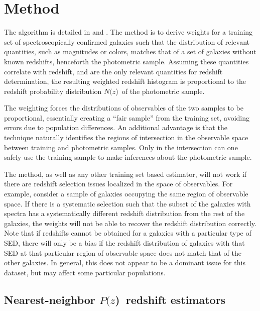 \documentclass[12pt,preprint]{aastex}
\newcommand{\pofz}{$P(z$)}
\newcommand{\nofz}{$N(z$)}
\begin{document}
\section{Method} \label{sec:method}

The algorithm is detailed in \citet{LimaPhotoz08} and \citet{CunhaPhotoz09}.
The method is to derive weights for a training set of spectroscopically
confirmed galaxies such that the distribution of relevant quantities, such as
magnitudes or colors, matches that of a set of galaxies without known
redshifts, henceforth the photometric sample.  Assuming these quantities
correlate with redshift, and are the only relevant quantities for redshift
determination, the resulting weighted redshift histogram is proportional to the
redshift probability distribution \nofz\ of the photometric sample. 

The weighting forces the distributions of observables of the two samples to
be proportional, essentially creating a ``fair sample'' from the training set,
avoiding errors due to population differences.  An additional advantage is that
the technique naturally identifies the regions of intersection in the
observable space between training and photometric samples. Only in the
intersection can one safely use the training sample to make inferences about
the photometric sample.

The method, as well as any other training set based estimator, will not work if
there are redshift selection issues localized in the space of observables.  For
example, consider a sample of galaxies occupying the same region of observable
space.  If there is a systematic selection such that the subset of the
galaxies with spectra has a systematically different redshift distribution from
the rest of the galaxies, the weights will not be able to recover the redshift
distribution correctly.  Note that if redshifts cannot be obtained for a
galaxies with a particular type of SED, there will only be a bias if the
redshift distribution of galaxies with that SED at that particular region of
observable space does not match that of the other galaxies.  In general, this
does not appear to be a dominant issue for this dataset, but may affect some
particular populations.

\subsection{Nearest-neighbor \pofz\ redshift estimators}\label{sec:nnpz}
\end{document}
